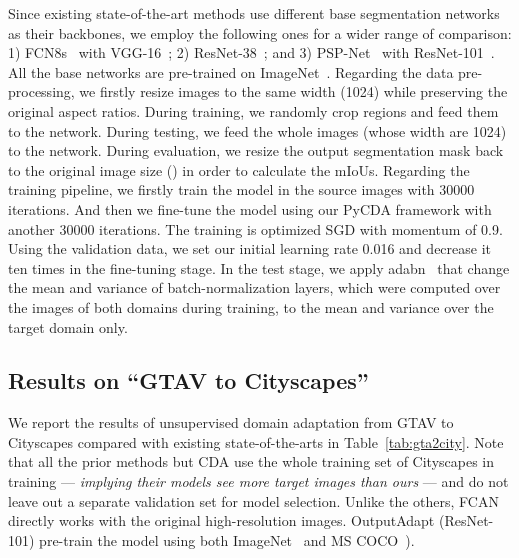\documentclass[10pt,twocolumn,letterpaper]{article}
\begin{document}
Since existing state-of-the-art methods use different base segmentation networks as their backbones, we employ the following ones for a wider range of comparison: 1) FCN8s~\cite{Long_2015_fcn} with VGG-16~\cite{simonyan2014deep}; 2) ResNet-38~\cite{res38}; and 3) PSP-Net~\cite{zhao2017pspnet} with ResNet-101~\cite{He_2016_resnet}. All the base networks are pre-trained on ImageNet~\cite{image_net}. Regarding the data pre-processing, we firstly resize images to the same width (1024) while preserving the original aspect ratios. During training, we randomly crop regions and feed them to the network. During testing, we feed the whole images (whose width are 1024) to the network. During evaluation, we resize the output segmentation mask back to the original image size () in order to calculate the mIoUs. Regarding the training pipeline, we firstly train the model in the source images with 30000 iterations. And then we fine-tune the model using our PyCDA framework with another 30000 iterations. The training is optimized SGD with momentum of 0.9. Using the validation data, we set our initial learning rate  0.016 and decrease it ten times in the fine-tuning stage. In the test stage, we apply adabn~\cite{adabn} that change the mean and variance of batch-normalization layers, which were computed over the images of both domains during training, to the mean and variance over the target domain only.




\subsection{Results on ``GTAV to Cityscapes''}
We report the results of unsupervised domain adaptation from GTAV to Cityscapes compared with existing state-of-the-arts in Table~\ref{tab:gta2city}. Note that all the prior methods but CDA use the whole training set of Cityscapes in training --- \emph{implying their models see more target images than ours} --- and do not leave out a separate validation set for model selection. Unlike the others, FCAN directly works with the original high-resolution images. OutputAdapt (ResNet-101) pre-train the model using both ImageNet~\cite{image_net} and MS COCO~\cite{coco}).
\end{document}
